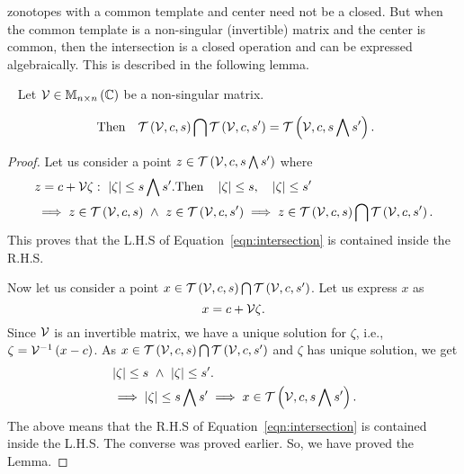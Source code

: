 zonotopes with a common template and center need not be a closed.  But
when the common template is a non-singular (invertible) matrix and
the center is common, then the intersection is a closed operation and
can be expressed algebraically.  This is described in the following
lemma.
%
\begin{lemma}~\label{lem:intersection}
Let ${\mathcal{V}\in\mathbb{M}_{n\times n}\left(\mathbb{C}\right)}$ be a non-singular matrix.  

%
\begin{equation}~\label{eqn:intersection}
\text{Then}\hspace{1em}\mathit{\operatorname{\mathcal{T}}}\left(\mathcal{V},c,s\right)\bigcap\mathit{\operatorname{\mathcal{T}}}\left(\mathcal{V},c,s^\prime\right)=\mathit{\operatorname{\mathcal{T}}}\left(\mathcal{V},c,s\bigwedge s^\prime\right).
\end{equation}
%
\end{lemma}
%
\begin{proof}
  Let us consider a
point $z\in\mathit{\operatorname{\mathcal{T}}}\left(\mathcal{V},c,s\bigwedge s^\prime\right)$ where
%
\begin{align*}
& z=c+\mathcal{V}\zeta:~\left|\zeta\right|\leq s\bigwedge s^\prime.
 \text{Then}\hspace{1em}\left|\zeta\right|\leq s,\hspace{1em}
  \left|\zeta\right|\leq s^\prime\\
& \implies {z\in\mathit{\operatorname{\mathcal{T}}}\left(\mathcal{V},c,s\right)}~\wedge~
           {z\in\mathit{\operatorname{\mathcal{T}}}\left(\mathcal{V},c,s^\prime\right)}
 \implies z\in
\mathit{\operatorname{\mathcal{T}}}\left(\mathcal{V},c,s\right)\bigcap\mathit{\operatorname{\mathcal{T}}}\left(\mathcal{V},c,s^\prime\right).           
\end{align*}
%
This proves that the L.H.S of Equation~\ref{eqn:intersection}
is contained inside the R.H.S.

Now let us consider a point
$x\in\mathit{\operatorname{\mathcal{T}}}\left(\mathcal{V},c,s\right)\bigcap\mathit{\operatorname{\mathcal{T}}}\left(\mathcal{V},c,s^\prime\right)$.
Let us express $x$ as 
%
\[
x=c+\mathcal{V}\zeta.
\]
%
Since $\mathcal{V}$ is an invertible matrix, we have a unique solution for
$\zeta$, i.e.,
$\zeta=\mathcal{V}^{-1}\left(x-c\right)$.  As
${x\in\mathit{\operatorname{\mathcal{T}}}\left(\mathcal{V},c,s\right)}
\bigcap\mathit{\operatorname{\mathcal{T}}}\left(\mathcal{V},c,s^\prime\right)$ and $\zeta$ has unique solution, we get
%
\begin{align*}
  &  \left|\zeta\right|
 \leq
s~\wedge~\left|\zeta\right|\leq
s^\prime.\\
& \implies \left|\zeta\right|\leq s\bigwedge s^\prime
\implies x\in\mathit{\operatorname{\mathcal{T}}}\left(\mathcal{V},c,s\bigwedge s^\prime\right).
\end{align*}
%
The above means that the R.H.S of Equation~\ref{eqn:intersection} is
contained inside the L.H.S.  The converse was proved earlier.  So, we
have proved the Lemma.
\end{proof}
